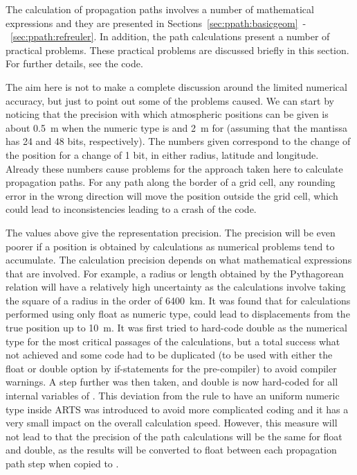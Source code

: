 \label{sec:ppath:comments}

The calculation of propagation paths involves a number of mathematical
expressions and they are presented in
Sections~\ref{sec:ppath:basicgeom}~-~\ref{sec:ppath:refreuler}. In
addition, the path calculations present a number of practical
problems. These practical problems are discussed briefly in this
section. For further details, see the code.



The aim here is not to make a complete discussion around
the limited numerical accuracy, but just to point out some of the
problems caused. We can start by noticing that the precision with
which atmospheric positions can be given is about 0.5~m when the
numeric type is  and 2~m for
 (assuming that the mantissa has 24 and 48 bits,
respectively). The numbers given correspond to the change of the
position for a change of 1 bit, in either radius, latitude and
longitude. Already these numbers cause problems for the approach taken
here to calculate propagation paths. For any path along the border of a
grid cell, any rounding error in the wrong direction will move the
position outside the grid cell, which could lead to inconsistencies
leading to a crash of the code.

The values above give the representation precision. The precision will
be even poorer if a position is obtained by calculations as numerical
problems tend to accumulate. The calculation precision depends on what
mathematical expressions that are involved.  For example, a radius or
length obtained by the Pythagorean relation will have a relatively
high uncertainty as the calculations involve taking the square of a
radius in the order of 6400~km. It was found that for calculations
performed using only float as numeric type, could lead to
displacements from the true position up to 10~m. It was first tried to
hard-code double as the numerical type for the most critical passages
of the calculations, but a total success what not achieved and some
code had to be duplicated (to be used with either the float or double
option by if-statements for the pre-compiler) to avoid compiler
warnings. A step further was then taken, and double is now hard-coded
for all internal variables of . This deviation
from the rule to have an uniform numeric type inside ARTS was
introduced to avoid more complicated coding and it has a very small
impact on the overall calculation speed. However, this measure will
not lead to that the precision of the path calculations will be the
same for float and double, as the results will be converted to float
between each propagation path step when copied to
.

